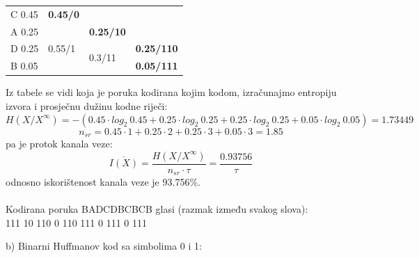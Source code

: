 \documentclass[12pt]{article}
\begin{document}
\begin{enumerate}
\begin{tabular}{|l|l|ll}
\cline{1-2}
C 0.45 & \textbf{0.45/0} &  &  \\ \cline{1-3}
A 0.25 & \multirow{3}{*}{0.55/1} & \multicolumn{1}{l|}{\textbf{0.25/10}} &  \\ \cline{1-1} \cline{3-4} 
D 0.25 &  & \multicolumn{1}{l|}{\multirow{2}{*}{0.3/11}} & \multicolumn{1}{l|}{\textbf{0.25/110}} \\ \cline{1-1} \cline{4-4} 
B 0.05 &  & \multicolumn{1}{l|}{} & \multicolumn{1}{l|}{\textbf{0.05/111}} \\ \hline
\end{tabular}


Iz tabele se vidi koja je poruka kodirana kojim kodom, izračunajmo entropiju izvora i prosječnu dužinu kodne riječi:
\begin{equation*}
    H(X/X^\infty) = -(0.45 \cdot log_2~0.45 + 0.25 \cdot log_2~0.25 + 0.25 \cdot log_2~0.25 + 0.05 \cdot log_2~ 0.05) = 1.73449
\end{equation*}
\begin{equation*}
    n_{sr} = 0.45 \cdot 1 + 0.25 \cdot 2 + 0.25 \cdot 3 + 0.05 \cdot 3 = 1.85
\end{equation*}
pa je protok kanala veze:
\begin{equation*}
    \overline{I(X)} = \frac{H(X/X^\infty)}{n_{sr} \cdot \tau} = \frac{0.93756}{\tau}
\end{equation*}
odnosno iskorištenost kanala veze je 93.756\%. \\
\\
Kodirana poruka BADCDBCBCB glasi (razmak između svakog slova): \\
111 10 110 0 110 111 0 111 0 111
\newpage

b) Binarni Huffmanov kod sa simbolima 0 i 1:
\\


\end{enumerate}
\end{document}
